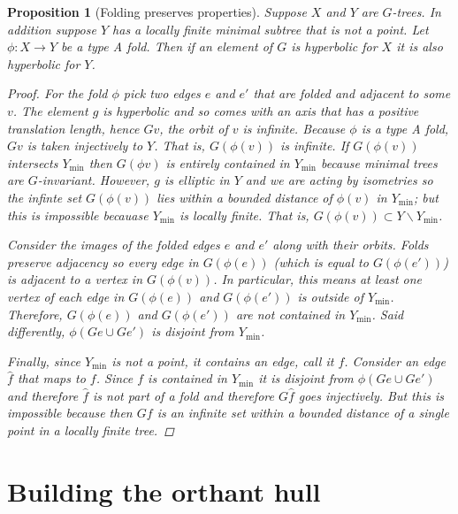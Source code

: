 \documentclass[12pt,parskip=full]{report}
\theoremstyle{plain}
\newtheorem{prop}[thm]{Proposition}
\theoremstyle{definition}
\begin{document}
\begin{prop}
    [Folding preserves properties]
    \label{lem:foldingpreserveshyp}
    Suppose $X$ and $Y$ are $G$-trees. In addition suppose $Y$ has a locally finite minimal subtree that is not a point. Let $\phi:X\to Y$ be a type A fold. Then if an element of $G$ is hyperbolic for $X$ it is also hyperbolic for $Y$.
    
    \begin{proof}
        For the fold $\phi$ pick two edges $e$ and $e'$ that are folded and adjacent to some $v$. The element $g$ is hyperbolic and so comes with an axis that has a positive translation length, hence $Gv$, the orbit of $v$ is infinite. Because $\phi$ is a type A fold, $G v$ is taken injectively to $Y$. That is, $G(\phi (v))$ is infinite. If $G(\phi (v))$ intersects $Y_\text{min}$ then $G(\phi v)$ is entirely contained in $Y_\text{min}$ because minimal trees are $G$-invariant. However, $g$ is elliptic in $Y$ and we are acting by isometries so the infinte set $G(\phi (v))$ lies within a bounded distance of $\phi (v)$ in $Y_\text{min}$; but this is impossible becauase $Y_\text{min}$ is locally finite. That is, $G(\phi (v))\subset Y\smallsetminus Y_\text{min}$. 
        
        Consider the images of the folded edges $e$ and $e'$ along with their orbits. 
        Folds preserve adjacency so every edge in $G(\phi (e))$ (which is equal to $G(\phi (e'))$) is adjacent to a vertex in $G( \phi (v))$. In particular, this means at least one vertex of each edge in $G(\phi (e))$ and $G(\phi (e'))$ is outside of $Y_\text{min}$. 
        Therefore, $G(\phi (e))$ and $G(\phi (e'))$ are not contained in $Y_\text{min}$. 
        Said differently, $\phi( Ge\cup Ge')$ is disjoint from $Y_\text{min}$.
        
        Finally, since $Y_\text{min}$ is not a point, it contains an edge, call it $f$. Consider an edge $\hat{f}$ that maps to $f$. Since $f$ is contained in $Y_\text{min}$ it is disjoint from $\phi( Ge\cup Ge')$ and therefore $\hat{f}$ is not part of a fold and therefore \(G\hat{f}\) goes injectively. But this is impossible because then $Gf$ is an infinite set within a bounded distance of a single point in a locally finite tree.
    \end{proof}
\end{prop}

\section{Building the orthant hull}
\end{document}
